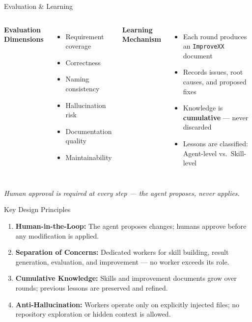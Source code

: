 \begin{frame}{Evaluation \& Learning}
    \begin{columns}[T]
        \textbf{Evaluation Dimensions}
        \begin{itemize}
            \item Requirement coverage
            \item Correctness
            \item Naming consistency
            \item Hallucination risk
            \item Documentation quality
            \item Maintainability
        \end{itemize}

        \textbf{Learning Mechanism}
        \begin{itemize}
            \item Each round produces an \texttt{ImproveXX} document
            \item Records issues, root causes, and proposed fixes
            \item Knowledge is \textbf{cumulative} --- never discarded
            \item Lessons are classified: Agent-level vs.\ Skill-level
        \end{itemize}
    \end{columns}

    \vspace{0.3cm}
    \centering
    \small\textit{Human approval is required at every step --- the agent proposes, never applies.}
\end{frame}

\begin{frame}{Key Design Principles}
    \begin{enumerate}
        \item \textbf{Human-in-the-Loop:} The agent proposes changes; humans approve before any modification is applied.
        \vspace{0.2cm}
        \item \textbf{Separation of Concerns:} Dedicated workers for skill building, result generation, evaluation, and improvement --- no worker exceeds its role.
        \vspace{0.2cm}
        \item \textbf{Cumulative Knowledge:} Skills and improvement documents grow over rounds; previous lessons are preserved and refined.
        \vspace{0.2cm}
        \item \textbf{Anti-Hallucination:} Workers operate only on explicitly injected files; no repository exploration or hidden context is allowed.
    \end{enumerate}
\end{frame}
